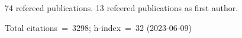 74 refereed publications. 13 refeered publications as first author.

Total citations~=~3298; h-index~=~32 (2023-06-09)